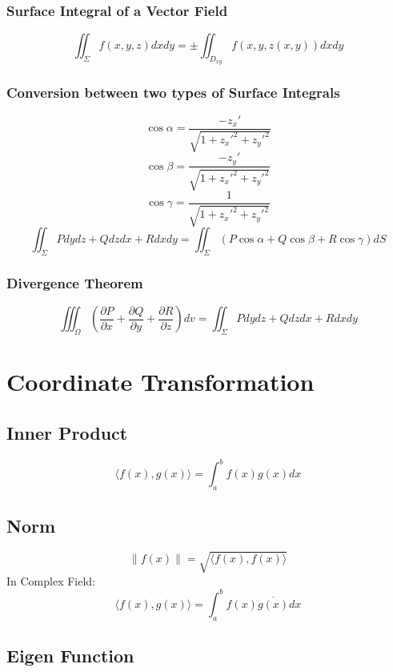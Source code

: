 \documentclass{article}
\begin{document}
\subsubsection{Surface Integral of a Vector Field}

\[
    \iint_\Sigma f(x, y, z) dx dy = \pm \iint_{D_{xy}} f(x, y, z(x, y)) dx dy
\]

\subsubsection{Conversion between two types of Surface Integrals}

\[
    \cos \alpha = \frac{-z_x'}{\sqrt{1 + z_x'^2 + z_y'^2}}
\]
\[
    \cos \beta = \frac{-z_y'}{\sqrt{1 + z_x'^2 + z_y'^2}}
\]
\[
    \cos \gamma = \frac{1}{\sqrt{1 + z_x'^2 + z_y'^2}}
\]
\[
    \iint_\Sigma P dy dz + Q dz dx + R dx dy = \iint_\Sigma (P \cos \alpha + Q \cos \beta + R \cos \gamma) dS
\]

\subsubsection{Divergence Theorem}

\[
    \iiint_\Omega \left(\frac{\partial P}{\partial x} + \frac{\partial Q}{\partial y} + \frac{\partial R}{\partial z}\right) dv = \iint_\Sigma P dy dz + Q dz dx + R dx dy
\]

\newpage
\section{Coordinate Transformation}

\subsection{Inner Product}

\[
    \langle f(x), g(x) \rangle = \int_a^b f(x) g(x) dx
\]

\subsection{Norm}

\[
    \|f(x)\| = \sqrt{\langle f(x), f(x) \rangle}
\]
In Complex Field:
\[
    \langle f(x), g(x) \rangle = \int_a^b f(x) \overline{g(x)} dx
\]

\subsection{Eigen Function}
\end{document}
